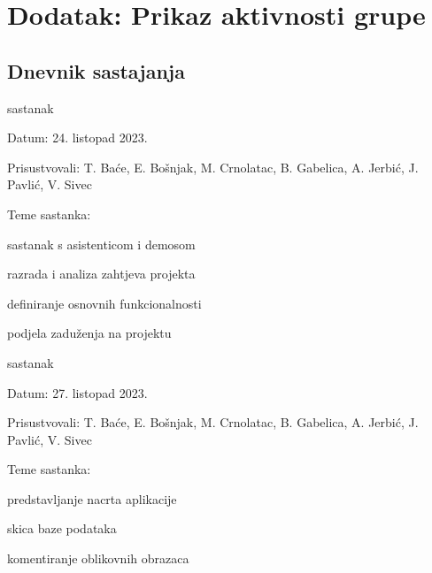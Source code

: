 \chapter*{Dodatak: Prikaz aktivnosti grupe}
		
		\section*{Dnevnik sastajanja}
		
		
		\begin{packed_enum}
			
			\item  sastanak
			\item[] \begin{packed_item}
				\item Datum: 24. listopad 2023.
				\item Prisustvovali: T. Baće, E. Bošnjak, M. Crnolatac, B. Gabelica, A. Jerbić, J. Pavlić, V. Sivec
				\item Teme sastanka:
				\begin{packed_item}
					\item sastanak s asistenticom i demosom
					\item  razrada i analiza zahtjeva projekta
					\item  definiranje osnovnih funkcionalnosti
					\item  podjela zaduženja na projektu
				\end{packed_item}
			\end{packed_item}
			
			\item  sastanak
			\item[] \begin{packed_item}
				\item Datum: 27. listopad 2023.
				\item Prisustvovali: T. Baće, E. Bošnjak, M. Crnolatac, B. Gabelica, A. Jerbić, J. Pavlić, V. Sivec
				\item Teme sastanka:
				\begin{packed_item}
					\item  predstavljanje nacrta aplikacije
					\item  skica baze podataka
					\item  komentiranje oblikovnih obrazaca
				\end{packed_item}
			\end{packed_item}
			

\end{packed_enum}
